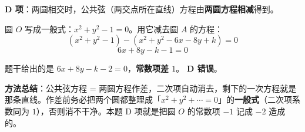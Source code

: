 \begin{answer}
\textbf{D 项}：两圆相交时，公共弦（两交点所在直线）方程由\textbf{两圆方程相减}得到。

圆 $O$ 写成一般式：$x^2+y^2-1=0$。用它减去圆 $A$ 的方程：
\nopagebreak[4]
\[\left(x^2+y^2-1\right)-\left(x^2+y^2-6x-8y+k\right)=0\]
\nopagebreak[4]
\[6x+8y-k-1=0\]

题干给出的是 $6x+8y-k-2=0$，\textbf{常数项差 $1$}。 \textbf{D 错误}。

\begin{gktip}
\textbf{方法总结}：公共弦方程 = 两圆方程作差，二次项自动消去，剩下的一次方程就是那条直线。作差前务必把两个圆都整理成「$x^2+y^2+\cdots=0$」的\textbf{一般式}（二次项系数同为 $1$），否则消不干净。本题 D 项就是把圆 $O$ 的常数项 $-1$ 记成 $-2$ 造成的。
\end{gktip}


\par\medskip

\end{answer}
